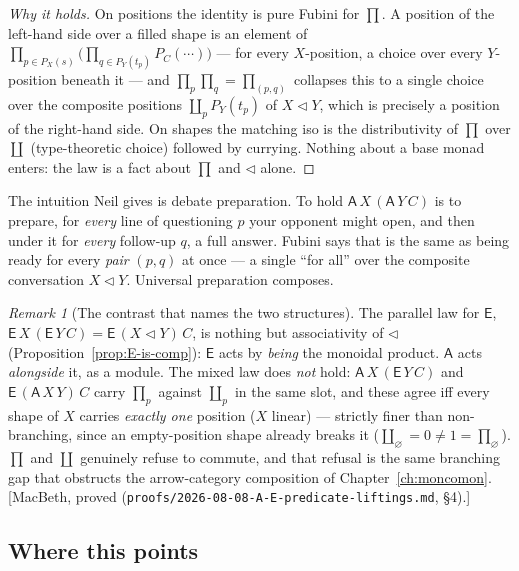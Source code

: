 \documentclass[11pt,a4paper]{book}
\theoremstyle{plain}
\theoremstyle{definition}
\theoremstyle{remark}
\newtheorem{Remark}[Theorem]{Remark}
\newcommand{\prov}[1]{\hfill\textsf{\footnotesize[#1]}}
\begin{document}
\begin{proof}[Why it holds]
On positions the identity is pure Fubini for $\prod$. A position of the left-hand
side over a filled shape is an element of
$\prod_{p\in P_X(s)}\bigl(\prod_{q\in P_Y(t_p)}P_C(\cdots)\bigr)$ --- for every
$X$-position, a choice over every $Y$-position beneath it --- and
$\prod_p\prod_q=\prod_{(p,q)}$ collapses this to a single choice over the composite
positions $\coprod_p P_Y(t_p)$ of $X\triangleleft Y$, which is precisely a position
of the right-hand side. On shapes the matching iso is the distributivity of $\prod$
over $\coprod$ (type-theoretic choice) followed by currying. Nothing about a base
monad enters: the law is a fact about $\prod$ and $\triangleleft$ alone.
\end{proof}

The intuition Neil gives is debate preparation. To hold
$\mathsf A\,X\,(\mathsf A\,Y\,C)$ is to prepare, for \emph{every} line of
questioning $p$ your opponent might open, and then under it for \emph{every}
follow-up $q$, a full answer. Fubini says that is the same as being ready for every
\emph{pair} $(p,q)$ at once --- a single ``for all'' over the composite conversation
$X\triangleleft Y$. Universal preparation composes.

\begin{Remark}[The contrast that names the two structures]
The parallel law for $\mathsf E$,
$\mathsf E\,X\,(\mathsf E\,Y\,C)=\mathsf E\,(X\triangleleft Y)\,C$, is nothing but
associativity of $\triangleleft$ (Proposition~\ref{prop:E-is-comp}): $\mathsf E$
acts by \emph{being} the monoidal product. $\mathsf A$ acts \emph{alongside} it, as
a module. The mixed law does \emph{not} hold: $\mathsf A\,X\,(\mathsf E\,Y\,C)$ and
$\mathsf E\,(\mathsf A\,X\,Y)\,C$ carry $\prod_p$ against $\coprod_p$ in the same
slot, and these agree iff every shape of $X$ carries \emph{exactly one} position
($X$ linear) --- strictly finer than non-branching, since an empty-position shape
already breaks it ($\coprod_\varnothing=0\neq1=\prod_\varnothing$). $\prod$ and
$\coprod$ genuinely refuse to commute, and that refusal is the same branching gap
that obstructs the arrow-category composition of Chapter~\ref{ch:moncomon}.
\prov{MacBeth, proved (\texttt{proofs/2026-08-08-A-E-predicate-liftings.md}, \S4).}
\end{Remark}

\subsection{Where this points}
\end{document}
